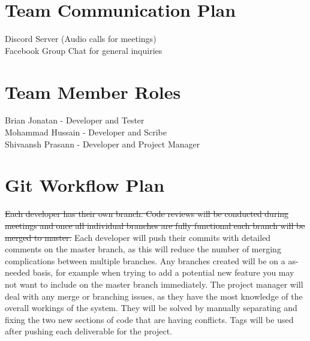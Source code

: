 \documentclass{article}
\begin{document}
\section{Team Communication Plan}
Discord Server (Audio calls for meetings)\\
Facebook Group Chat for general inquiries

\section{Team Member Roles}
Brian Jonatan - Developer and Tester\\
Mohammad Hussain - Developer and Scribe\\
Shivaansh Prasann - Developer and Project Manager

\section{Git Workflow Plan}
\sout{Each developer has their own branch. Code reviews will be conducted during meetings and once all individual branches are fully functional each branch will be merged to master.} {\color{magenta} Each developer will push their commits with detailed comments on the master branch, as this will reduce the number of merging complications between multiple branches. Any branches created will be on a as-needed basis, for example when trying to add a potential new feature you may not want to include on the master branch immediately. The project manager will deal with any merge or branching issues, as they have the most knowledge of the overall workings of the system. They will be solved by manually separating and fixing the two new sections of code that are having conflicts.} Tags will be used after pushing each deliverable for the project.
\end{document}
